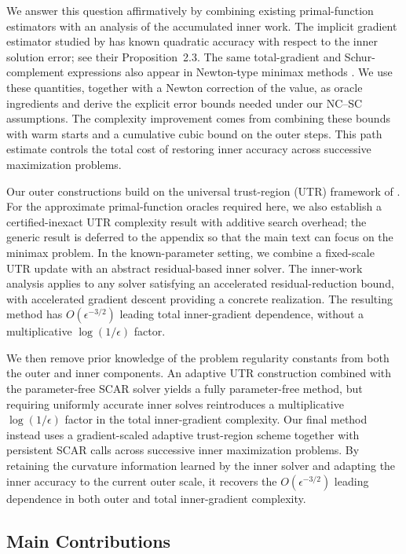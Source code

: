 We answer this question affirmatively by combining existing
primal-function estimators with an analysis of the accumulated inner
work. The implicit gradient estimator studied by
\citet{ablin2020superefficiency} has known quadratic accuracy with
respect to the inner solution error; see their Proposition~2.3.
The same total-gradient and Schur-complement expressions also appear
in Newton-type minimax methods \citep{zhang2020newton}.
We use these quantities, together with a Newton correction of the
value, as oracle ingredients and derive the explicit error bounds
needed under our NC--SC assumptions.
The complexity improvement comes from combining these bounds with
warm starts and a cumulative cubic bound on the outer steps.
This path estimate controls the total cost of restoring inner
accuracy across successive maximization problems.

Our outer constructions build on the universal trust-region (UTR)
framework of \citet{jiang2026utr}. For the approximate
primal-function oracles required here, we also establish a
certified-inexact UTR complexity result with additive search overhead;
the generic result is deferred to the appendix so that the main text
can focus on the minimax problem. In the known-parameter setting, we
combine a fixed-scale UTR update with an abstract residual-based inner
solver. The inner-work analysis applies to any solver satisfying an
accelerated residual-reduction bound, with accelerated gradient descent
providing a concrete realization. The resulting method has
$O(\epsilon^{-3/2})$ leading total inner-gradient dependence, without
a multiplicative $\log(1/\epsilon)$ factor.

We then remove prior knowledge of the problem regularity constants
from both the outer and inner components. An adaptive UTR construction
combined with the parameter-free SCAR solver yields a fully
parameter-free method, but requiring uniformly accurate inner solves
reintroduces a multiplicative $\log(1/\epsilon)$ factor in the total
inner-gradient complexity. Our final method instead uses a
gradient-scaled adaptive trust-region scheme together with persistent
SCAR calls across successive inner maximization problems. By retaining
the curvature information learned by the inner solver and adapting the
inner accuracy to the current outer scale, it recovers the
$O(\epsilon^{-3/2})$ leading dependence in both outer and total
inner-gradient complexity.


\subsection{Main Contributions}
\label{sec:contributions}

